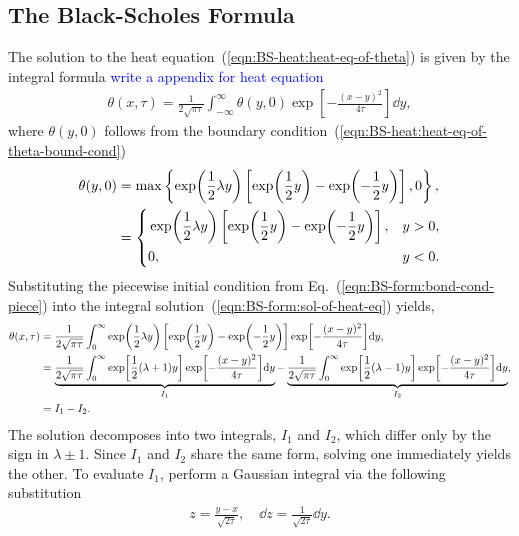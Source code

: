 \documentclass{book}
\begin{document}
\subsection{The Black-Scholes Formula}

The solution to the heat equation~(\ref{eqn:BS-heat:heat-eq-of-theta}) is given by the integral formula  \textcolor{blue}{write a appendix for heat equation}
\begin{align}
    \label{eqn:BS-form:sol-of-heat-eq}
    \theta(x, \tau) = \frac{1}{2\sqrt{\pi\tau}} \int_{-\infty}^{\infty} \theta(y,0)\exp[-\frac{(x-y)^2}{4\tau}]\dd y,
\end{align}
where $\theta(y,0)$ follows from the boundary condition~(\ref{eqn:BS-heat:heat-eq-of-theta-bound-cond})
\begin{align}
    \label{eqn:BS-form:bond-cond-piece}
    \theta(y,0) &= \max\left\{ \exp(\frac{1}{2}\lambda y) \left[ \exp(\frac{1}{2}y) - \exp(-\frac{1}{2}y)\right], 0\right\}, \notag\\
    &= 
    \left\{
    \begin{aligned}
        &\exp(\frac{1}{2}\lambda y) \left[ \exp(\frac{1}{2}y) - \exp(-\frac{1}{2}y)\right], &&y > 0,\\
        &0, &&y < 0.
    \end{aligned}
    \right.
\end{align}
Substituting the piecewise initial condition from Eq.~(\ref{eqn:BS-form:bond-cond-piece}) into the integral solution~(\ref{eqn:BS-form:sol-of-heat-eq}) yields,
\begin{align}
    \theta(x, \tau) &= \frac{1}{2\sqrt{\pi\tau}} \int_{0}^{\infty}\exp(\frac{1}{2}\lambda y) \left[ \exp(\frac{1}{2}y) - \exp(-\frac{1}{2}y)\right]\exp[-\frac{(x-y)^2}{4\tau}]\dd y, \notag\\
    &= \underbrace{\frac{1}{2\sqrt{\pi\tau}} \int_{0}^{\infty}\exp[\frac{1}{2}(\lambda + 1) y] \exp[-\frac{(x-y)^2}{4\tau}]\dd y}
    _{I_1}
    - 
    \underbrace{\frac{1}{2\sqrt{\pi\tau}} \int_{0}^{\infty}\exp[\frac{1}{2}(\lambda - 1) y] \exp[-\frac{(x-y)^2}{4\tau}]\dd y}
    _{I_2}
    , \notag\\
    &= I_1 - I_2.
    \label{eqn:BS-form:theta-I1-I2}
\end{align}
The solution decomposes into two integrals, $I_1$ and $I_2$, which differ only by the sign in $\lambda \pm 1$.
Since $I_1$ and $I_2$ share the same form, solving one immediately yields the other. To evaluate $I_1$, perform a Gaussian integral via the following substitution
\begin{align}
    z = \frac{y-x}{\sqrt{2\tau}},\quad \dd z = \frac{1}{\sqrt{2\tau}} \dd y.
\end{align}
\end{document}
